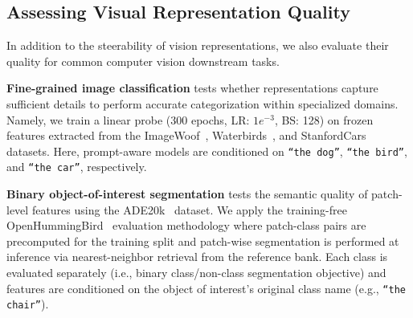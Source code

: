\subsection{Assessing Visual Representation Quality}
\label{apdx:feature_quality}

In addition to the steerability of vision representations, we also evaluate their quality for common computer vision downstream tasks. 

\noindent\textbf{Fine-grained image classification} tests whether representations capture sufficient details to perform accurate categorization within specialized domains. Namely, we train a linear probe (300 epochs, LR: $1e^{-3}$, BS: 128) on frozen features extracted from the ImageWoof~\cite{Howard_Imagewoof_2019}, Waterbirds~\cite{Sagawa2020_waterbirds}, and StanfordCars~\cite{stanford_cars} datasets. 
Here, prompt-aware models are conditioned on \texttt{``the dog''}, \texttt{``the bird''}, and \texttt{``the car''}, respectively. 

\noindent\textbf{Binary object-of-interest segmentation} tests the semantic quality of patch-level features using the ADE20k~\cite{zhou2017scene} dataset.
We apply the training-free OpenHummingBird~\cite{pariza2024hbird} evaluation methodology where patch-class pairs are precomputed for the training split and patch-wise segmentation is performed at inference via nearest-neighbor retrieval from the reference bank. Each class is evaluated separately (i.e., binary class/non-class segmentation objective) and features are conditioned on the object of interest's original class name (e.g., \texttt{``the chair''}). 








